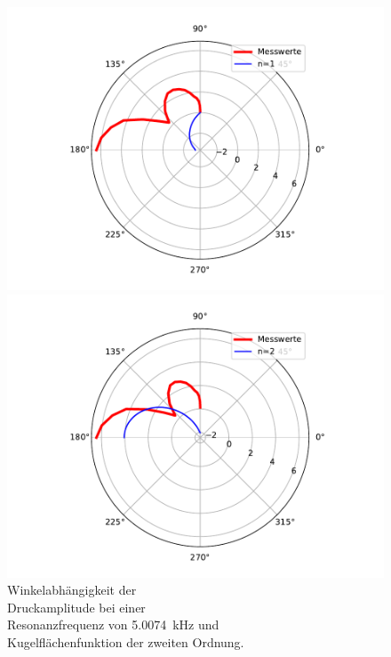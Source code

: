 \begin{figure}
    \hspace*{2cm}
    \begin{minipage}[b]{.4\linewidth} %
        \hspace*{-2cm}
        \includegraphics[width=\linewidth]{figure/Resonanz_Drewinkel_Amplitude_4_n1.pdf}
        \caption{Winkelabhängigkeit der\\ Druckamplitude bei einer \\ Resonanzfrequenz von \SI{5.0074}{\kilo\hertz} und \\ Kugelflächenfunktion der ersten Ordnung.}
        \label{fig:Resonanz_Drewinkel_Amplitude_4_n1}
     \end{minipage}
     \hspace{.1\linewidth}%
     \begin{minipage}[b]{.4\linewidth} %
        \hspace*{-2cm}
        \includegraphics[width=\linewidth]{figure/Resonanz_Drewinkel_Amplitude_4_n2.pdf}
        \caption{Winkelabhängigkeit der\\ Druckamplitude bei einer \\ Resonanzfrequenz von \SI{5.0074}{\kilo\hertz} und \\ Kugelflächenfunktion der zweiten Ordnung.}
     \end{minipage}
\end{figure}
